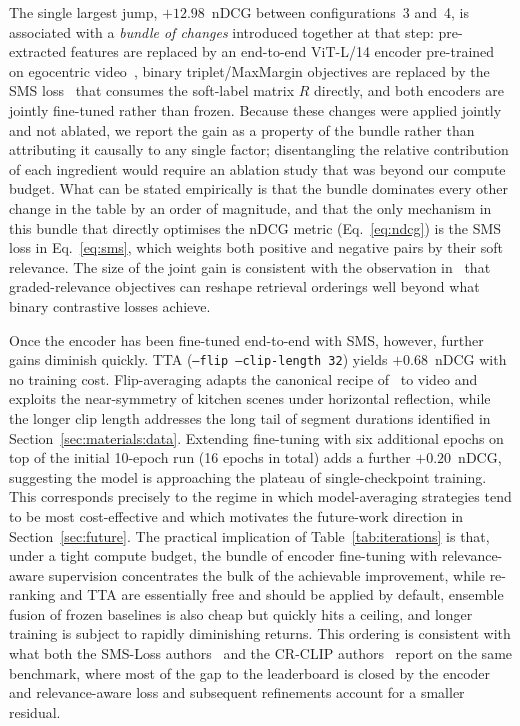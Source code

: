 The single largest jump, $+12.98$~nDCG between configurations~3 and~4, is associated with a \emph{bundle of changes} introduced together at that step: pre-extracted features are replaced by an end-to-end ViT-L/14 encoder pre-trained on egocentric video~\cite{zhao2023avion,zhao2023lavila}, binary triplet/MaxMargin objectives are replaced by the SMS loss~\cite{wang2024symmetricmultisimilaritylossepickitchens100} that consumes the soft-label matrix $R$ directly, and both encoders are jointly fine-tuned rather than frozen. Because these changes were applied jointly and not ablated, we report the gain as a property of the bundle rather than attributing it causally to any single factor; disentangling the relative contribution of each ingredient would require an ablation study that was beyond our compute budget. What can be stated empirically is that the bundle dominates every other change in the table by an order of magnitude, and that the only mechanism in this bundle that directly optimises the nDCG metric (Eq.~\eqref{eq:ndcg}) is the SMS loss in Eq.~\eqref{eq:sms}, which weights both positive and negative pairs by their soft relevance. The size of the joint gain is consistent with the observation in~\cite{wray2021semantic} that graded-relevance objectives can reshape retrieval orderings well beyond what binary contrastive losses achieve.

Once the encoder has been fine-tuned end-to-end with SMS, however, further gains diminish quickly. TTA (\texttt{--flip --clip-length 32}) yields $+0.68$~nDCG with no training cost. Flip-averaging adapts the canonical recipe of~\cite{krizhevsky2012alexnet} to video and exploits the near-symmetry of kitchen scenes under horizontal reflection, while the longer clip length addresses the long tail of segment durations identified in Section~\ref{sec:materials:data}. Extending fine-tuning with six additional epochs on top of the initial 10-epoch run (16 epochs in total) adds a further $+0.20$~nDCG, suggesting the model is approaching the plateau of single-checkpoint training. This corresponds precisely to the regime in which model-averaging strategies tend to be most cost-effective and which motivates the future-work direction in Section~\ref{sec:future}. The practical implication of Table~\ref{tab:iterations} is that, under a tight compute budget, the bundle of encoder fine-tuning with relevance-aware supervision concentrates the bulk of the achievable improvement, while re-ranking and TTA are essentially free and should be applied by default, ensemble fusion of frozen baselines is also cheap but quickly hits a ceiling, and longer training is subject to rapidly diminishing returns. This ordering is consistent with what both the SMS-Loss authors~\cite{wang2024symmetricmultisimilaritylossepickitchens100} and the CR-CLIP authors~\cite{he2025crclip} report on the same benchmark, where most of the gap to the leaderboard is closed by the encoder and relevance-aware loss and subsequent refinements account for a smaller residual.
